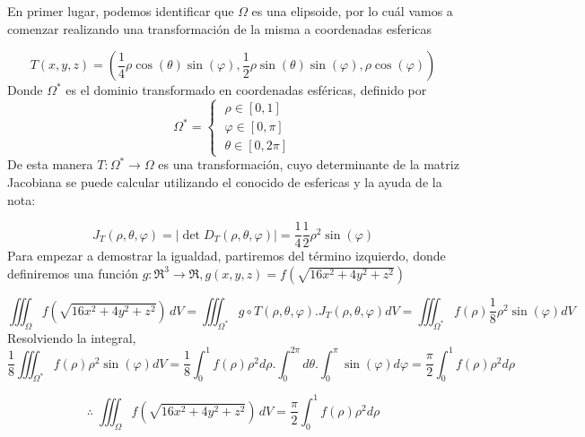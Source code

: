 
\begin{solution}
 En primer lugar, podemos identificar que $\Omega $  es una elipsoide, por lo cuál vamos a comenzar realizando una transformación de la misma a coordenadas esfericas

\[
T(x,y,z) = \left( \frac{1}{4} \rho \cos(\theta)\sin( \varphi), \frac{1}{2} \rho \sin(\theta)\sin( \varphi),  \rho \cos(\varphi) \right)
\]
Donde $\Omega^*$ es el dominio transformado en coordenadas esféricas, definido por
 \[\Omega^*=\begin{cases}
            \;\rho \in [0,1] \\[5pt]
            \; \varphi \in [0,\pi] \\[5pt]
            \;\theta \in [0,2\pi]
        \end{cases}
    \]
De esta manera $T:\Omega^* \rightarrow \Omega$ es una transformación, cuyo determinante de la matriz Jacobiana se puede calcular utilizando el conocido de esfericas y la ayuda de la nota:

\[
J_T(\rho, \theta,\varphi) = \left| \det D_T (\rho, \theta,\varphi) \right| = \frac{1}{4}\frac{1}{2}\rho^2\sin(\varphi)
\]
Para empezar a demostrar la igualdad, partiremos del término izquierdo, donde definiremos una función $g:\Re^3\rightarrow\Re, g(x,y,z)=f(\sqrt{16x^2 + 4y^2 + z^2})$

\[
\iiint_\Omega f(\sqrt{16x^2 + 4y^2 + z^2}) \, dV=\iiint_{\Omega^*}g \circ T (\rho, \theta,\varphi).J_T(\rho, \theta,\varphi)dV=\iiint_{\Omega^*}f(\rho) \frac{1}{8}\rho^2\sin(\varphi)dV
\]
Resolviendo la integral,
\[
\frac{1}{8}\iiint_{\Omega^*}f(\rho) \rho^2\sin(\varphi)dV=\frac{1}{8}\int_0^{1} f(\rho) \rho^2d\rho.\int_0^{2\pi}d\theta.\int_0^{\pi}\sin(\varphi)d\varphi= \frac{\pi}{2}\int_0^{1} f(\rho) \rho^2d\rho
\]

$$\therefore\;\iiint_\Omega f(\sqrt{16x^2 + 4y^2 + z^2}) \, dV = \frac{\pi}{2}\int_0^{1} f(\rho) \rho^2d\rho$$

\end{solution}
